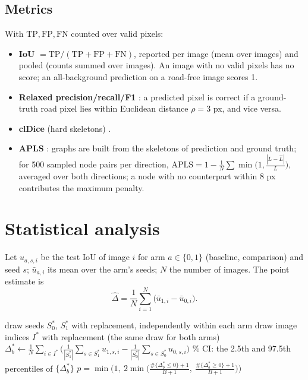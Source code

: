 \documentclass[11pt]{article}
\begin{document}
\subsection{Metrics}

With $\mathrm{TP},\mathrm{FP},\mathrm{FN}$ counted over valid pixels:
\begin{itemize}
  \item \textbf{IoU} $= \mathrm{TP}/(\mathrm{TP}+\mathrm{FP}+\mathrm{FN})$, reported per image
        (mean over images) and pooled (counts summed over images). An image with no valid pixels
        has no score; an all-background prediction on a road-free image scores 1.
  \item \textbf{Relaxed precision/recall/F1} \cite{mnih2010}: a predicted pixel is correct if a
        ground-truth road pixel lies within Euclidean distance $\rho = 3$ px, and vice versa.
  \item \textbf{clDice} (hard skeletons) \cite{shit2021}.
  \item \textbf{APLS} \cite{vanetten2018}: graphs are built from the skeletons of prediction and
        ground truth; for 500 sampled node pairs per direction,
        $\mathrm{APLS} = 1 - \frac1N\sum\min\!\big(1, \frac{|L - \hat L|}{L}\big)$, averaged over
        both directions; a node with no counterpart within 8 px contributes the maximum penalty.
\end{itemize}

\section{Statistical analysis}
\label{sec:stats}

Let $u_{a,s,i}$ be the test IoU of image $i$ for arm $a\in\{0,1\}$ (baseline, comparison) and seed
$s$; $\bar u_{a,i}$ its mean over the arm's seeds; $N$ the number of images. The point estimate is
\begin{equation}
  \hat\Delta = \frac1N\sum_{i=1}^N \big(\bar u_{1,i} - \bar u_{0,i}\big).
\end{equation}

\begin{algorithm}[h]
\caption{Two-level paired bootstrap (primary interval)}
\begin{algorithmic}[1]
  \State draw seeds $S_0^\ast$, $S_1^\ast$ with replacement, independently within each arm
  \State draw image indices $I^\ast$ with replacement (the same draw for both arms)
  \State $\Delta^\ast_b \gets \frac{1}{N}\sum_{i\in I^\ast}\Big(\frac{1}{|S_1^\ast|}\sum_{s\in S_1^\ast}u_{1,s,i} - \frac{1}{|S_0^\ast|}\sum_{s\in S_0^\ast}u_{0,s,i}\Big)$
\EndFor
{}\% CI: the 2.5th and 97.5th percentiles of $\{\Delta^\ast_b\}$
\State $p = \min\!\Big(1,\ 2\min\!\Big(\frac{\#\{\Delta^\ast_b\le0\}+1}{B+1},\ \frac{\#\{\Delta^\ast_b\ge0\}+1}{B+1}\Big)\Big)$
\end{algorithmic}
\end{algorithm}
\end{document}
